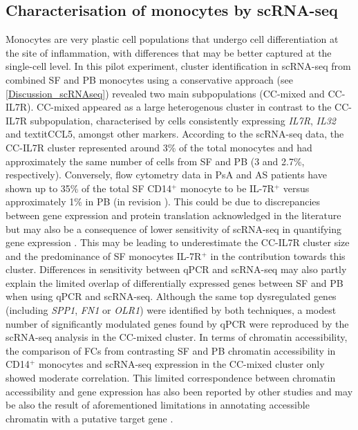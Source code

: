 \subsection{Characterisation of monocytes by scRNA-seq}
Monocytes are very plastic cell populations that undergo cell differentiation at the site of inflammation, with differences that may be better captured at the single-cell level. In this pilot experiment, cluster identification in scRNA-seq from combined SF and PB monocytes using a conservative approach (see \ref{Discussion_scRNAseq}) revealed two main subpopulations (CC-mixed and CC-IL7R). CC-mixed appeared as a large heterogenous cluster in contrast to the CC-IL7R subpopulation, characterised by cells consistently expressing \textit{IL7R}, \textit{IL32} and textit{CCL5}, amongst other markers. According to the scRNA-seq data, the CC-IL7R cluster represented around 3\% of the total monocytes and had approximately the same number of cells from SF and PB (3 and 2.7\%, respectively). Conversely, flow cytometry data in PsA and AS patients have shown up to 35\% of the total SF CD14$^+$ monocyte to be IL-7R$^+$ versus approximately 1\% in PB (in revision \parencite{Al-Mossawi2018}). This could be due to discrepancies between gene expression and protein translation acknowledged in the literature but may also be a consequence of lower sensitivity of scRNA-seq in quantifying gene expression \parencite{Liu2016,Islam2014}. This may be leading to underestimate the CC-IL7R cluster size and the predominance of SF monocytes IL-7R$^+$ in the contribution towards this cluster. Differences in sensitivity between qPCR and scRNA-seq may also partly explain the limited overlap of differentially expressed genes between SF and PB when using qPCR and scRNA-seq. Although the same top dysregulated genes (including \textit{SPP1}, \textit{FN1} or \textit{OLR1}) were identified by both techniques, a modest number of significantly modulated genes found by qPCR were reproduced by the scRNA-seq analysis in the CC-mixed cluster. In terms of chromatin accessibility, the comparison of FCs from contrasting SF and PB chromatin accessibility in CD14$^+$ monocytes and scRNA-seq expression in the CC-mixed cluster only showed moderate correlation. This limited correspondence between chromatin accessibility and gene expression has also been reported by other studies and may be also the result of aforementioned limitations in annotating accessible chromatin with a putative target gene \parencite{Ackermann2016,Wang2018}.

